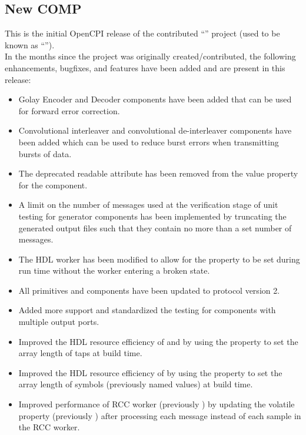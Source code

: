 \subsection{New  COMP}
\label{sec:23_sdr}
This is the initial OpenCPI release of the contributed ``'' project (used to be known as ``'').\\

In the months since the project was originally created/contributed, the following enhancements, bugfixes, and features have been added and are present in this release:
\begin{itemize}
\setlength\itemsep{0em} %
\item Golay Encoder and Decoder components have been added that can be used for forward error correction.
\item Convolutional interleaver and convolutional de-interleaver components have been added which can be used to reduce burst errors when transmitting bursts of data.
\item The deprecated readable attribute has been removed from the value property for the  component.
\item A limit on the number of messages used at the verification stage of unit testing for generator components has been implemented by truncating the generated output files such that they contain no more than a set number of messages.
\item The  HDL worker has been modified to allow for the  property to be set during run time without the worker entering a broken state.
\item All primitives and components have been updated to protocol version 2.
\item Added more support and standardized the testing for components with multiple output ports.
\item Improved the HDL resource efficiency of  and  by using the  property to set the array length of taps at build time.
\item Improved the HDL resource efficiency of  by using the  property to set the array length of symbols (previously named values) at build time.
\item Improved performance of RCC worker  (previously ) by updating the volatile property  (previously ) after processing each message instead of each sample in the RCC worker.

\end{itemize}
